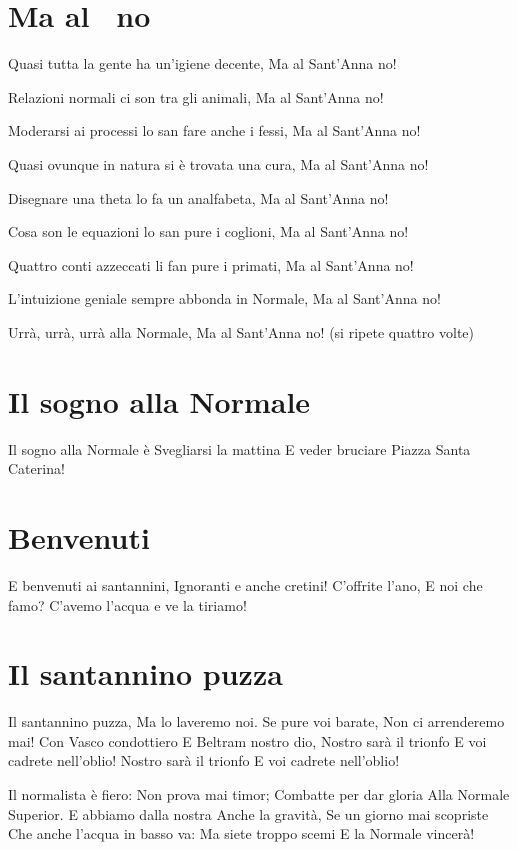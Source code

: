 \section{Ma al \santanna\ no}
\subtitle{Sulla melodia di “Ma la notte no”}
\begin{canzone}
Quasi tutta la gente ha un’igiene decente,
Ma al Sant'Anna no!

Relazioni normali ci son tra gli animali,
Ma al Sant'Anna no!

Moderarsi ai processi lo san fare anche i fessi,
Ma al Sant'Anna no!

Quasi ovunque in natura si è trovata una cura,
Ma al Sant'Anna no!

Disegnare una theta lo fa un analfabeta,
Ma al Sant'Anna no!

Cosa son le equazioni lo san pure i coglioni,
Ma al Sant'Anna no!

Quattro conti azzeccati li fan pure i primati,
Ma al Sant'Anna no!

L’intuizione geniale sempre abbonda in Normale,
Ma al Sant'Anna no!

Urrà, urrà, urrà alla Normale,
Ma al Sant'Anna no! 
(si ripete quattro volte)
\end{canzone}

\section{Il sogno alla Normale}
\subtitle{Sulla melodia di “Il sogno di un Pisano”}
\begin{canzone}
Il sogno alla Normale è 
Svegliarsi la mattina
E veder bruciare 
Piazza Santa Caterina! 
\end{canzone}

\section{Benvenuti}
\subtitle{Sulla melodia di “La società dei Magnaccioni” di Lando Fiorini}
\begin{canzone}
E benvenuti ai santannini,
Ignoranti e anche cretini!
C’offrite l’ano,
E noi che famo?
C’avemo l’acqua e ve la tiriamo!
\end{canzone}

\section{Il santannino puzza}
\subtitle{Sulla melodia della “Virginia Company”}
\begin{canzone}
Il santannino puzza,
Ma lo laveremo noi.
Se pure voi barate,
Non ci arrenderemo mai!
Con Vasco condottiero
E Beltram nostro dio,
Nostro sarà il trionfo
E voi cadrete nell’oblio!
Nostro sarà il trionfo
E voi cadrete nell’oblio!

Il normalista è fiero:
Non prova mai timor;
Combatte per dar gloria
Alla Normale Superior.
E abbiamo dalla nostra
Anche la gravità,
Se un giorno mai scopriste
Che anche l’acqua in basso va:
Ma siete troppo scemi
E la Normale vincerà!
\end{canzone}

